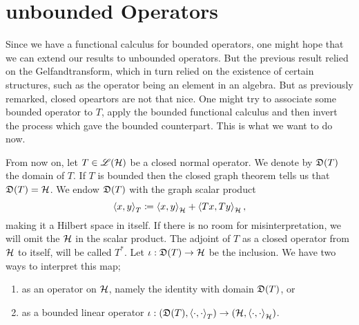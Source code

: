 \section{unbounded Operators}

Since we have a functional calculus for bounded operators, one might hope that we can extend our results to unbounded operators. But the previous result relied on the Gelfandtransform, which in turn relied on the existence of certain structures, such as the operator being an element in an algebra. But as previously remarked, closed opeartors are not that nice. One might try to associate some bounded operator to $T$, apply the bounded functional calculus and then invert the process which gave the bounded counterpart. This is what we want to do now.

From now on, let $T \in \mathscr{L}(\mathcal{H})$ be a closed normal operator. We denote by $\mathfrak{D}(T)$ the domain of $T$.
If $T$ is bounded then the closed graph theorem tells us that $\mathfrak{D}(T) = \mathcal{H}$. We endow $\mathfrak{D}(T)$ with the graph scalar product
\[
 \left\langle x,y \right\rangle_T \coloneqq  \left\langle x, y \right\rangle_{\mathcal{H}} + \left\langle  Tx, Ty \right\rangle_{\mathcal{H}},
\]
making it a Hilbert space in itself. If there is no room for misinterpretation, we will omit the $\mathcal{H}$ in the scalar product. The adjoint of $T$ as a closed operator from $\mathcal{H}$ to itself, will be called $T^*$. Let $\iota : \mathfrak{D}(T) \to \mathcal{H}$ be the inclusion. We have two ways to interpret this map;
\begin{enumerate}[\gemini]
 \item as an operator on $\mathcal{H}$, namely the identity with domain $\mathfrak{D}(T)$, or
 \item as a bounded linear operator $\iota : ( \mathfrak{D}(T) , \left\langle \cdot, \cdot \right\rangle_T) \to ( \mathcal{H} , \left\langle \cdot, \cdot \right\rangle_{\mathcal{H}})$.
\end{enumerate}


